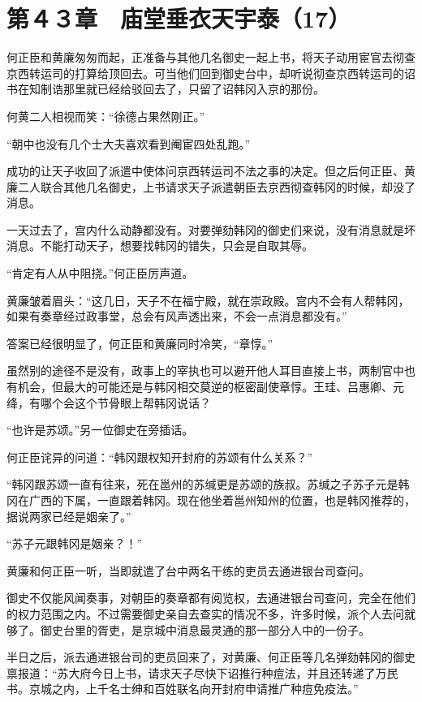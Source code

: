 \section{第４３章　庙堂垂衣天宇泰（17）}

何正臣和黄廉匆匆而起，正准备与其他几名御史一起上书，将天子动用宦官去彻查京西转运司的打算给顶回去。可当他们回到御史台中，却听说彻查京西转运司的诏书在知制诰那里就已经给驳回去了，只留了诏韩冈入京的那份。

何黄二人相视而笑：“徐德占果然刚正。”

“朝中也没有几个士大夫喜欢看到阉宦四处乱跑。”

成功的让天子收回了派遣中使体问京西转运司不法之事的决定。但之后何正臣、黄廉二人联合其他几名御史，上书请求天子派遣朝臣去京西彻查韩冈的时候，却没了消息。

一天过去了，宫内什么动静都没有。对要弹劾韩冈的御史们来说，没有消息就是坏消息。不能打动天子，想要找韩冈的错失，只会是自取其辱。

“肯定有人从中阻挠。”何正臣厉声道。

黄廉皱着眉头：“这几日，天子不在福宁殿，就在崇政殿。宫内不会有人帮韩冈，如果有奏章经过政事堂，总会有风声透出来，不会一点消息都没有。”

答案已经很明显了，何正臣和黄廉同时冷笑，“章惇。”

虽然别的途径不是没有，政事上的宰执也可以避开他人耳目直接上书，两制官中也有机会，但最大的可能还是与韩冈相交莫逆的枢密副使章惇。王珪、吕惠卿、元绛，有哪个会这个节骨眼上帮韩冈说话？

“也许是苏颂。”另一位御史在旁插话。

何正臣诧异的问道：“韩冈跟权知开封府的苏颂有什么关系？”

“韩冈跟苏颂一直有往来，死在邕州的苏缄更是苏颂的族叔。苏缄之子苏子元是韩冈在广西的下属，一直跟着韩冈。现在他坐着邕州知州的位置，也是韩冈推荐的，据说两家已经是姻亲了。”

“苏子元跟韩冈是姻亲？！”

黄廉和何正臣一听，当即就遣了台中两名干练的吏员去通进银台司查问。

御史不仅能风闻奏事，对朝臣的奏章都有阅览权，去通进银台司查问，完全在他们的权力范围之内。不过需要御史亲自去查实的情况不多，许多时候，派个人去问就够了。御史台里的胥吏，是京城中消息最灵通的那一部分人中的一份子。

半日之后，派去通进银台司的吏员回来了，对黄廉、何正臣等几名弹劾韩冈的御史禀报道：“苏大府今日上书，请求天子尽快下诏推行种痘法，并且还转递了万民书。京城之内，上千名士绅和百姓联名向开封府申请推广种痘免疫法。”

